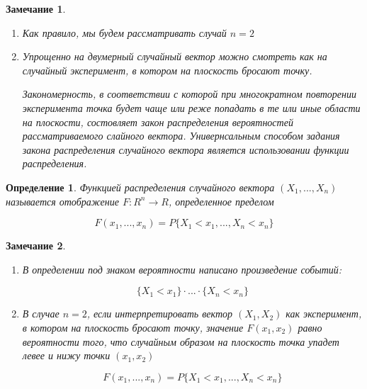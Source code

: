 \documentclass[a4paper, 14pt]{report}
\newtheorem{defenition}{Определение}[section]
\newtheorem{note}{Замечание}[section]
\begin{document}
\begin{note}
    \begin{enumerate}
        \item Как правило, мы будем рассматривать случай $n=2$
        \item Упрощенно на двумерный случайный вектор можно смотреть как на случайный эксперимент, в котором на плоскость бросают точку.

            Закономерность, в соответствии с которой при многократном повторении эксперимента точка будет чаще или реже попадать в те или иные области на плоскости, состовляет закон распределения вероятностей рассматриваемого слайного вектора. Универнсальным способом задания закона распределения случайного вектора является использовании функции распределения.
    \end{enumerate}
\end{note}

\begin{defenition}
    Функцией распределения случайного вектора $(X_1, ..., X_n)$ называется отображение $F: R^n \to R$, определенное пределом

    $$
    F(x_1,...,x_n) = P\{X_1 < x_1,..., X_n < x_n\}
    $$
\end{defenition}

\begin{note}
    \begin{enumerate}
        \item В определении под знаком вероятности написано произведение событий:

            $$
            \{X_1 < x_1\} \cdot ... \cdot \{X_n < x_n\}
            $$

        \item В случае $n=2$, если интерпретировать вектор $(X_1,X_2)$ как эксперимент, в котором на плоскость бросают точку, значение $F(x_1,x_2)$ равно вероятности того, что случайным образом на плоскость точка упадет левее и нижу точки $(x_1,x_2)$

            $$
            F(x_1,...,x_n) = P\{X_1 < x_1,..., X_n < x_n\}
            $$
    \end{enumerate}
\end{note}
\end{document}
